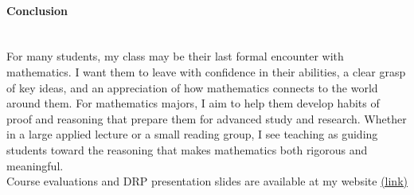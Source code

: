 \documentclass[11pt]{article}
\begin{document}
\paragraph{Conclusion} \quad \\
For many students, my class may be their last formal encounter with mathematics. I want them to leave with confidence in their abilities, a clear grasp of key ideas, and an appreciation of how mathematics connects to the world around them. For mathematics majors, I aim to help them develop habits of proof and reasoning that prepare them for advanced study and research. Whether in a large applied lecture or a small reading group, I see teaching as guiding students toward the reasoning that makes mathematics both rigorous and meaningful.
\\

\noindent Course evaluations and DRP presentation slides are available at my website \href{https://sites.google.com/view/myungsin-cho/teaching?authuser=0}{(link)}
\end{document}

